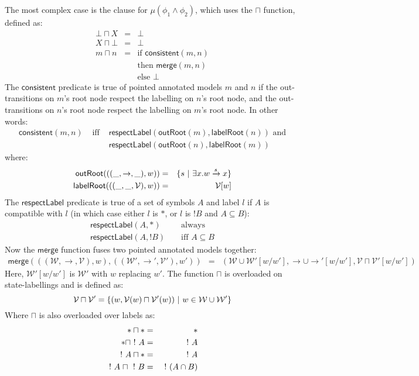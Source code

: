 The most complex case is the clause for $\mu (\phi_1 \land \phi_2)$, which uses the $\sqcap$ function, defined as:
\begin{eqnarray}
\bot \sqcap X & = & \bot \nonumber \\
X \sqcap \bot & = & \bot \nonumber \\
m \sqcap n & = & \mbox{if } \mathsf{consistent}(m, n)\nonumber \\
	& & \mbox{then } \mathsf{merge}(m, n) \nonumber \\
	& & \mbox{else } \bot \nonumber
\end{eqnarray}
The $\mathsf{consistent}$ predicate is true of pointed annotated models $m$ and $n$ if the out-transitions on $m$'s root node respect the labelling on $n$'s root node, and the out-transitions on $n$'s root node respect the labelling on $m$'s root node. In other words:
\begin{eqnarray}
\mathsf{consistent}(m, n) & \mbox{ iff } & \mathsf{respectLabel}(\mathsf{outRoot}(m), \mathsf{labelRoot}(n)) \mbox{ and} \nonumber \\
& & \mathsf{respectLabel}(\mathsf{outRoot}(n), \mathsf{labelRoot}(m)) \nonumber
\end{eqnarray}
where:
\begin{eqnarray}
\mathsf{outRoot}(((\_,\rightarrow,\_),w)) & = & \{ s \ | \  \exists x . w \xrightarrow{s} x \} \nonumber \\
\mathsf{labelRoot}(((\_,\_,\mathcal{V}),w)) & = & \mathcal{V}[w] \nonumber
\end{eqnarray}
The $\mathsf{respectLabel}$ predicate is true of  a set of symbols $A$ and label $l$ if $A$ is compatible with $l$ (in which case either $l$ is $\ast$, or $l$ is $!B$ and $A \subseteq B$):
\begin{eqnarray}
\mathsf{respectLabel}(A, *) & & \mbox{ always} \nonumber \\
\mathsf{respectLabel}(A, !B) & & \mbox{ iff } A \subseteq B \nonumber
\end{eqnarray}
Now the $\mathsf{merge}$ function fuses two pointed annotated models together:
\begin{eqnarray}
\mathsf{merge}(((\mathcal{W},\rightarrow,\mathcal{V}), w), ((\mathcal{W}',\rightarrow',\mathcal{V}'), w')) & = & (\mathcal{W} \cup \mathcal{W}'[w/w'], \rightarrow \cup \rightarrow'[w/w'], \mathcal{V} \sqcap \mathcal{V}'[w/w']) \nonumber
\end{eqnarray}
Here, $\mathcal{W}'[w/w']$ is $\mathcal{W}'$ with $w$ replacing $w'$.
The function $\sqcap$ is overloaded on state-labellings and is defined as:
\[
\mathcal{V} \sqcap \mathcal{V}' = \{ (w, \mathcal{V}(w) \sqcap \mathcal{V}'(w) ) \ | \  w \in \mathcal{W} \cup \mathcal{W}'\}
\]
Where $\sqcap$ is also overloaded over labels as:
\begin{eqnarray}
\ast \sqcap \ast & = & \ast \nonumber \\
\ast \sqcap \ ! \  A & = & \ ! \  A \nonumber \\
\ ! \  A \sqcap \ast & = & \ ! \  A \nonumber \\
\ ! \  A \; \sqcap \; \ ! \  B & = & \ ! \  (A \cap B) \nonumber
\end{eqnarray}

